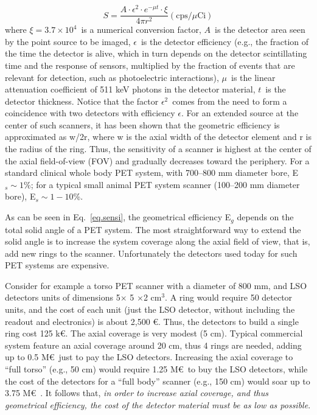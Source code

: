 \documentclass[review]{elsarticle}
\begin{document}
\begin{equation}
S = \frac{A \cdot \epsilon^2 \cdot e^{-\mu t} \cdot \xi}{4 \pi r^2} (\mathrm{cps}/\mu \mathrm{Ci})
\label{eq.sensi}
\end{equation}
%
where $\xi = 3.7 \times 10^4$~is a numerical conversion factor, $A$~is the detector area seen by the point source to be imaged, $\epsilon$~is the detector efficiency (e.g., the fraction of the time the detector is alive, which in turn depends on the detector scintillating time and the response of sensors, multiplied by the fraction of events that are relevant for detection, such as photoelectric interactions), $\mu$~is the linear attenuation coefficient of 511 keV photons in the detector material, $t$~is the detector thickness. Notice that the factor $\epsilon^2$~comes from the need to form a coincidence with two detectors with efficiency $\epsilon$. For an extended source at the center of such scanners, it has been shown that the geometric efficiency is approximated as w/2r, where w is the axial width of the detector element and r is the radius of the ring. Thus, the sensitivity of a scanner is highest at the center of the axial field-of-view (FOV) and gradually decreases toward the periphery.
For a standard clinical whole body PET
system, with 700--800 mm diameter bore, E$_s \sim 1$\%; for a typical
small animal PET system scanner (100--200 mm diameter bore), E$_s \sim 1-10$\%.

As can be seen in Eq.~\ref{eq.sensi}, the geometrical efficiency E$_g$ depends on the total solid angle of a PET system.  The most straightforward way to extend the solid angle is to increase the system
coverage along the axial field of view, that is, add new rings to the scanner. Unfortunately the detectors used today for such PET systems are expensive.

Consider for example a torso PET scanner with a diameter of 800 mm, and LSO detectors units of dimensions 5$\times$ 5 $\times $2 cm$^3$. A ring would require 50 detector units, and the cost of each unit (just the LSO detector, without including the readout and electronics) is about 2,500 \euro. Thus, the detectors to build a single ring cost 125 k\euro. The axial coverage is very modest (5 cm). Typical commercial system feature an axial coverage around 20 cm, thus 4 rings are needed,  adding up to 0.5 M\euro\ just to pay the LSO detectors. Increasing the axial coverage to ``full torso'' (e.g., 50 cm) would require 1.25 M\euro\ to buy the LSO detectors, while the cost of the detectors for a ``full body'' scanner (e.g., 150 cm) would soar up to 3.75 M\euro\ . It follows that, {\em in order to increase axial coverage, and thus geometrical efficiency, the cost of the detector material must be as low as possible}.
\end{document}
